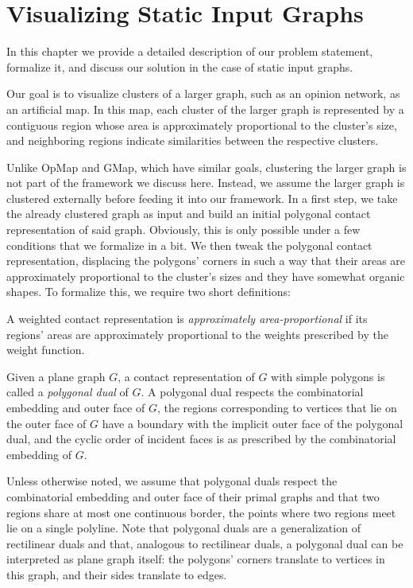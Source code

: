 \chapter{Visualizing Static Input Graphs}
\label{chap:visualizing-static-input-graphs}

In this chapter we provide a detailed description of our problem statement, formalize it, and discuss our solution in the case of static input graphs.

Our goal is to visualize clusters of a larger graph, such as an opinion network, as an artificial map.
In this map, each cluster of the larger graph is represented by a contiguous region whose area is approximately proportional to the cluster's size, and neighboring regions indicate similarities between the respective clusters.

Unlike OpMap and GMap, which have similar goals, clustering the larger graph is not part of the framework we discuss here.
Instead, we assume the larger graph is clustered externally before feeding it into our framework.
In a first step, we take the already clustered graph as input and build an initial polygonal contact representation of said graph.
Obviously, this is only possible under a few conditions that we formalize in a bit.
We then tweak the polygonal contact representation, displacing the polygons' corners in such a way that their areas are approximately proportional to the cluster's sizes and they have somewhat organic shapes.
To formalize this, we require two short definitions:

\begin{definition}
A weighted contact representation is \emph{approximately area-proportional} if its regions' areas are approximately proportional to the weights prescribed by the weight function.
\end{definition}

\begin{definition}
Given a plane graph $G$, a contact representation of $G$ with simple polygons is called a \emph{polygonal dual} of $G$.
A polygonal dual respects the combinatorial embedding and outer face of $G$, \ie{} the regions corresponding to vertices that lie on the outer face of $G$ have a boundary with the implicit outer face of the polygonal dual, and the cyclic order of incident faces is as prescribed by the combinatorial embedding of $G$.
\end{definition}

Unless otherwise noted, we assume that polygonal duals respect the combinatorial embedding and outer face of their primal graphs and that two regions share at most one continuous border, \ie{} the points where two regions meet lie on a single polyline.
Note that polygonal duals are a generalization of rectilinear duals and that, analogous to rectilinear duals, a polygonal dual can be interpreted as plane graph itself: the polygons' corners translate to vertices in this graph, and their sides translate to edges.

